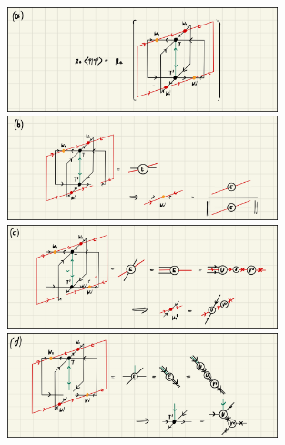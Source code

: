 %		
\begin{figure}
	\centering
	\subcaptionbox{\label{fig:YB_move_iterate_polar_overlap}}
	{%
		\includegraphics[width=0.7\textwidth]{figures/disoTPS/YB_move_iterate_polar_a.jpeg}
	}
	\subcaptionbox{\label{fig:YB_move_iterate_polar_optimize_W2}}
	{%
		\includegraphics[width=0.7\textwidth]{figures/disoTPS/YB_move_iterate_polar_b.jpeg}
	}
	\subcaptionbox{\label{fig:YB_move_iterate_polar_optimize_W1}}
	{%
		\includegraphics[width=0.7\textwidth]{figures/disoTPS/YB_move_iterate_polar_c.jpeg}
	}
	\subcaptionbox{\label{fig:YB_move_iterate_polar_optimize_T}}
	{%
		\includegraphics[width=0.7\textwidth]{figures/disoTPS/YB_move_iterate_polar_d.jpeg}
	}
	\caption{}
	\label{fig:YB_move_iterate_polar}
\end{figure}
